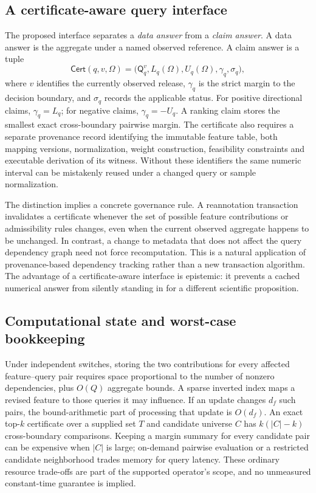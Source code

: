 \documentclass[conference]{IEEEtran}
\newcommand{\OO}{\mathcal{\Omega}}
\newcommand{\Q}{\mathsf{Q}}
\begin{document}
\subsection{A certificate-aware query interface}
The proposed interface separates a \emph{data answer} from a \emph{claim answer}. A data answer is the aggregate under a named observed reference. A claim answer is a tuple
\begin{equation}
\mathsf{Cert}(q,v,\OO)=\big(\Q_q^v,L_q(\OO),U_q(\OO),\gamma_q,\sigma_q\big),
\label{eq:record}
\end{equation}
where $v$ identifies the currently observed release, $\gamma_q$ is the strict margin to the decision boundary, and $\sigma_q$ records the applicable status. For positive directional claims, $\gamma_q=L_q$; for negative claims, $\gamma_q=-U_q$. A ranking claim stores the smallest exact cross-boundary pairwise margin. The certificate also requires a separate provenance record identifying the immutable feature table, both mapping versions, normalization, weight construction, feasibility constraints and executable derivation of its witness. Without these identifiers the same numeric interval can be mistakenly reused under a changed query or sample normalization.

The distinction implies a concrete governance rule. A reannotation transaction invalidates a certificate whenever the set of possible feature contributions or admissibility rules changes, even when the current observed aggregate happens to be unchanged. In contrast, a change to metadata that does not affect the query dependency graph need not force recomputation. This is a natural application of provenance-based dependency tracking rather than a new transaction algorithm. The advantage of a certificate-aware interface is epistemic: it prevents a cached numerical answer from silently standing in for a different scientific proposition.

\subsection{Computational state and worst-case bookkeeping}
Under independent switches, storing the two contributions for every affected feature--query pair requires space proportional to the number of nonzero dependencies, plus $O(Q)$ aggregate bounds. A sparse inverted index maps a revised feature to those queries it may influence. If an update changes $d_f$ such pairs, the bound-arithmetic part of processing that update is $O(d_f)$. An exact top-$k$ certificate over a supplied set $T$ and candidate universe $C$ has $k(|C|-k)$ cross-boundary comparisons. Keeping a margin summary for every candidate pair can be expensive when $|C|$ is large; on-demand pairwise evaluation or a restricted candidate neighborhood trades memory for query latency. These ordinary resource trade-offs are part of the supported operator's scope, and no unmeasured constant-time guarantee is implied.
\end{document}
